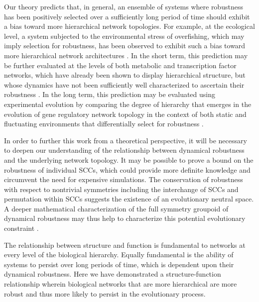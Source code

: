 Our theory predicts that, in general, an ensemble of systems where robustness has been positively selected over a sufficiently long period of time should exhibit a bias toward more hierarchical network topologies. For example, at the ecological level, a system subjected to the environmental stress of overfishing, which may imply selection for robustness, has been observed to exhibit such a bias toward more hierarchical network architectures \cite{Bascompte2005}. In the short term, this prediction may be further evaluated at the levels of both metabolic and transcription factor networks, which have already been shown to display hierarchical structure, but whose dynamics have not been sufficiently well characterized to ascertain their robustness \cite{Zhao2006,Bhardwaj2010,Colm}.
In the long term, this prediction may be evaluated using experimental evolution by comparing the degree of hierarchy that emerges in the evolution of gene regulatory network topology in the context of both static and fluctuating environments that differentially select for robustness \cite{Leroi1994}.

In order to further this work from a theoretical perspective, it will be necessary to deepen our understanding of the relationship between dynamical robustness and the underlying network topology.
It may be possible to prove a bound on the robustness of individual SCCs, which could provide more definite knowledge and circumvent the need for expensive simulations. The conservation of robustness with respect to nontrivial symmetries including the interchange of SCCs and permutation within SCCs suggests the existence of an evolutionary neutral space. A deeper mathematical characterization of the full symmetry groupoid of dynamical robustness may thus help to characterize this potential evolutionary constraint \cite{Golubitsky2006}.

The relationship between structure and function is fundamental to networks at every level of the biological hierarchy. Equally fundamental is the ability of systems to persist over long periods of time, which is dependent upon their dynamical robustness. Here we have demonstrated a structure-function relationship wherein biological networks that are more hierarchical are more robust and thus more likely to persist in the evolutionary process.
